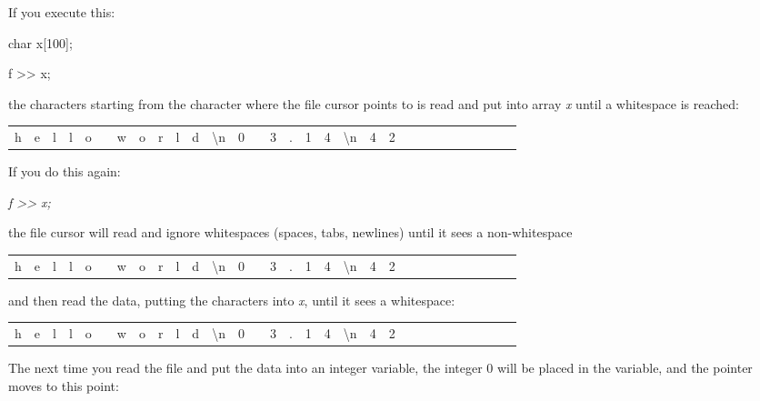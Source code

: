 \documentclass[
]{article}
\begin{document}
If you execute this:

char x{[}100{]};

f \textgreater\textgreater{} x;

the characters starting from the character where the file cursor points
to is read and put into array \emph{x} until a whitespace is reached:

\begin{longtable}[]{@{}llllllllllllllllllllllllllllll@{}}
\toprule\noalign{}
& & & & & & & & & & & & & & & & & & & & & & & & & & & & & \\
\midrule\noalign{}
\endhead
\bottomrule\noalign{}
\endlastfoot
h & e & l & l & o & & w & o & r & l & d & \textbackslash n & 0 & & 3 & .
& 1 & 4 & \textbackslash n & 4 & 2 & & & & & & & & & \\
\end{longtable}

If you do this again:

\emph{f \textgreater\textgreater{} x;}

the file cursor will read and ignore whitespaces (spaces, tabs,
newlines) until it sees a non-whitespace

\begin{longtable}[]{@{}llllllllllllllllllllllllllllll@{}}
\toprule\noalign{}
& & & & & & & & & & & & & & & & & & & & & & & & & & & & & \\
\midrule\noalign{}
\endhead
\bottomrule\noalign{}
\endlastfoot
h & e & l & l & o & & w & o & r & l & d & \textbackslash n & 0 & & 3 & .
& 1 & 4 & \textbackslash n & 4 & 2 & & & & & & & & & \\
\end{longtable}

and then read the data, putting the characters into \emph{x}, until it
sees a whitespace:

\begin{longtable}[]{@{}llllllllllllllllllllllllllllll@{}}
\toprule\noalign{}
& & & & & & & & & & & & & & & & & & & & & & & & & & & & & \\
\midrule\noalign{}
\endhead
\bottomrule\noalign{}
\endlastfoot
h & e & l & l & o & & w & o & r & l & d & \textbackslash n & 0 & & 3 & .
& 1 & 4 & \textbackslash n & 4 & 2 & & & & & & & & & \\
\end{longtable}

The next time you read the file and put the data into an integer
variable, the integer 0 will be placed in the variable, and the pointer
moves to this point:
\end{document}
